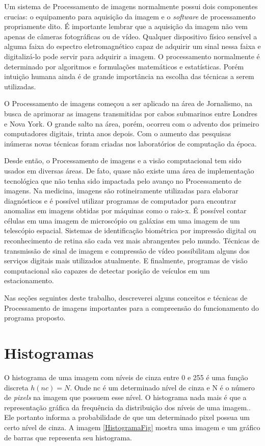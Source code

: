     Um sistema de Processamento de imagens normalmente possui dois componentes crucias: o equipamento para aquisição da imagem e o \textit{software} de processamento propriamente dito. É importante lembrar que a aquisição da imagem não vem apenas de câmeras fotográficas ou de vídeo. Qualquer dispositivo físico sensível a alguma faixa do espectro eletromagnético capaz de adquirir um sinal nessa faixa e digitalizá-lo pode servir para adquirir a imagem. O processamento normalmente é determinado por algoritmos e formulações matemáticos e estatísticas. Porém intuição humana ainda é de grande importância na escolha das técnicas a serem utilizadas.

    O Processamento de imagens começou a ser aplicado na área de Jornalismo, na busca de aprimorar as imagens transmitidas por cabos submarinos entre Londres e Nova York. \cite{marques1999processamento} O grande salto na área, porém, ocorreu com o advento dos primeiro computadores digitais, trinta anos depois. Com o aumento das pesquisas inúmeras novas técnicas foram criadas nos laboratórios de computação da época.

    Desde então, o Processamento de imagens e a visão computacional tem sido usados em diversas áreas. De fato, quase não existe uma área de implementação tecnológica que não tenha sido impactada pelo avanço no Processamento de imagens. Na medicina, imagens são rotineiramente utilizadas para elaborar diagnósticos e é possível utilizar programas de computador para encontrar anomalias em imagens obtidas por máquinas como o raio-x. É possível contar células em uma imagem de microscópio ou galáxias em uma imagem de um telescópio espacial. Sistemas de identificação biométrica por impressão digital ou reconhecimento de retina são cada vez mais abrangentes pelo mundo. Técnicas de transmissão de sinal de imagem e compressão de vídeo possibilitam alguns dos serviços digitais mais utilizados atualmente. E finalmente, programas de visão computacional são capazes de detectar posição de veículos em um estacionamento.

    Nas seções seguintes deste trabalho, descreverei alguns conceitos e técnicas de Processamento de imagens importantes para a compreensão do funcionamento do programa proposto.

    \section{Histogramas} \label{histograma}
        O histograma de uma imagem com níveis de cinza entre 0 e 255 é uma função discreta $h(nc) = N$. Onde nc é um determinado nível de cinza e N é o número de \textit{pixels} na imagem que possuem esse nível.\cite{gonzalez2009digital} O histograma nada mais é que a representação gráfica da frequência da distribuição dos níveis de uma imagem.\cite{IBGE2000introducao}. Ele portanto informa a probabilidade de que um determinado pixel possua um certo nível de cinza. A imagem \ref{HistogramaFig} mostra uma imagem e um gráfico de barras que representa seu histograma.

